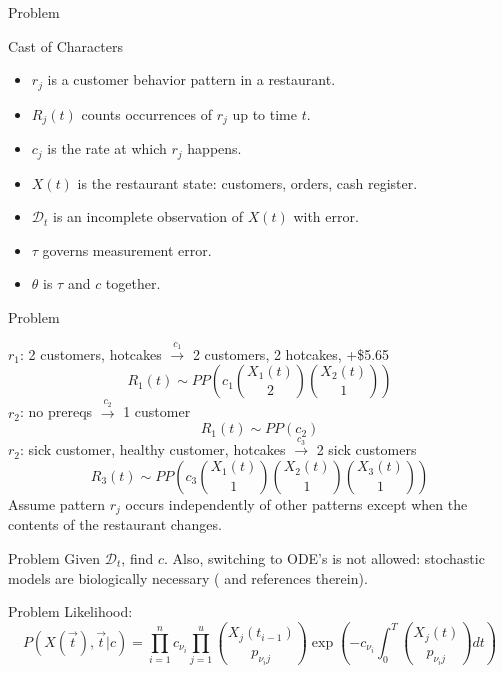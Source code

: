 \documentclass[12pt,a4paper,t,xcolor=dvipsnames,slidestop,compress,mathserif]{beamer}
\begin{document}
\begin{frame}{Problem}

Cast of Characters 
\begin{itemize}
\item $r_j$ is a customer behavior pattern in a restaurant.
\item $R_j(t)$ counts occurrences of $r_j$ up to time $t$.
\item $c_j$ is the rate at which $r_j$ happens.
\item $X(t)$ is the restaurant state: customers, orders, cash register. 
\item $\mathcal{D}_t$ is an incomplete observation of $X(t)$ with error.
\item $\tau$ governs measurement error.
\item $\theta$ is $\tau$ and $c$ together.
\end{itemize}

\end{frame}
\begin{frame}{Problem}

$r_1$: 2 customers, hotcakes $\xrightarrow{c_1}$ 2 customers, 2 hotcakes, +\$5.65 \\
\pause
$$R_1(t)\sim PP(c_1{X_1(t)\choose2}{X_2(t)\choose1})$$
\pause
$r_2$: no prereqs $\xrightarrow{c_2}$ 1 customer\\
\pause
$$R_1(t)\sim PP(c_2)$$
\pause
$r_2$: sick customer, healthy customer, hotcakes $\xrightarrow{c_3}$ 2 sick customers\\
\pause
$$R_3(t)\sim PP(c_3{X_1(t)\choose1}{X_2(t)\choose1}{X_3(t)\choose1})$$
Assume pattern $r_j$ occurs independently of other patterns except when the contents of the restaurant changes.
\end{frame}
\begin{frame}{Problem}
Given $\mathcal{D}_t$, find $c$. 
\pause
Also, switching to ODE's is not allowed: stochastic models are biologically necessary (\cite{reinker2006parameter} and references therein).
\end{frame}

\begin{frame}{Problem}
Likelihood: $$P(X(\vec{t}), \vec{t}|c) = \prod_{i=1}^n c_{\nu_{i}} \prod_{j=1}^u {{X_{j}(t_{i-1})}\choose{p_{{\nu_{i}}j}}}\exp\left(-c_{\nu_{i}}\int_0^T {{X_j(t)}\choose{p_{{\nu_{i}}j}}} dt\right)$$
\end{frame}
\end{document}
